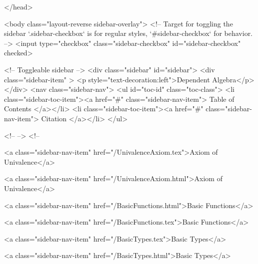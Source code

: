   
</head>




  <body class="layout-reverse sidebar-overlay">
    <!-- Target for toggling the sidebar `.sidebar-checkbox` is for regular
     styles, `#sidebar-checkbox` for behavior. -->
<input type="checkbox" class="sidebar-checkbox" id="sidebar-checkbox" checked>

<!-- Toggleable sidebar -->
<div class="sidebar" id="sidebar">
  <div class="sidebar-item" >
    <p style="text-decoration:left">Dependent Algebra</p>
  </div>
  <nav class="sidebar-nav">
    <ul id="toc-id" class="toc-class">
  <li class="sidebar-toc-item"><a href="#" class="sidebar-nav-item"> Table of Contents </a></li>
  <li class="sidebar-toc-item"><a href="#" class="sidebar-nav-item"> Citation </a></li>
</ul>


    <!--  -->
    <!-- 
      
    
      
    
      
    
      
    
      
        
      
    
      
        
          <a class="sidebar-nav-item" href="/UnivalenceAxiom.tex">Axiom of Univalence</a>
        
      
    
      
        
          <a class="sidebar-nav-item" href="/UnivalenceAxiom.html">Axiom of Univalence</a>
        
      
    
      
        
          <a class="sidebar-nav-item" href="/BasicFunctions.html">Basic Functions</a>
        
      
    
      
        
          <a class="sidebar-nav-item" href="/BasicFunctions.tex">Basic Functions</a>
        
      
    
      
        
          <a class="sidebar-nav-item" href="/BasicTypes.tex">Basic Types</a>
        
      
    
      
        
          <a class="sidebar-nav-item" href="/BasicTypes.html">Basic Types</a>
        
      
    

